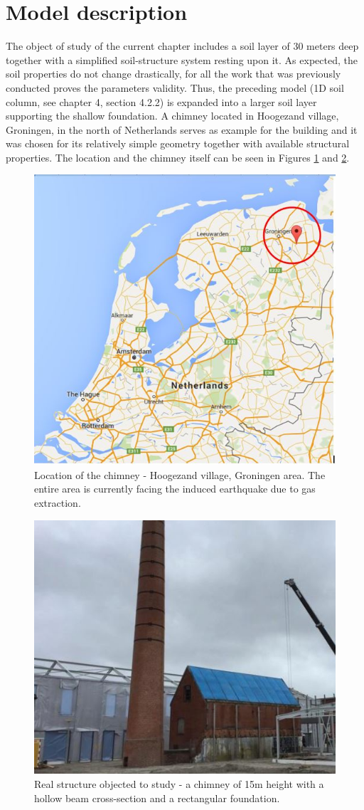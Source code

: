 	\section{Model description}
	The object of study of the current chapter includes a soil layer of 30 meters deep together with a simplified soil-structure system resting upon it. As expected, the soil properties do not change drastically, for all the work that was previously conducted proves the parameters validity. Thus, the preceding model (1D soil column, see chapter 4, section 4.2.2) is expanded into a larger soil layer supporting the shallow foundation. A chimney located in Hoogezand village, Groningen, in  the north of Netherlands serves as example for the building and it was chosen for its relatively simple geometry together with available structural properties. The location and the chimney itself can be seen in Figures \ref{Boom} and \ref{chimney}.
	
	\begin{figure}[!h]
		\centering
		\includegraphics[width=0.5 \linewidth]{"Boomgaard"}
		\caption{Location of the chimney - Hoogezand village, Groningen area. The entire area is currently facing the induced earthquake due to gas extraction.}
		\label{Boom}
	\end{figure} 
	
	\begin{figure}[!h]
		\centering
		\includegraphics[width=0.5 \linewidth]{"chimney"}
		\caption{Real structure objected to study - a chimney of 15m height with a hollow beam cross-section and a rectangular foundation.}
		\label{chimney}
	\end{figure} 

